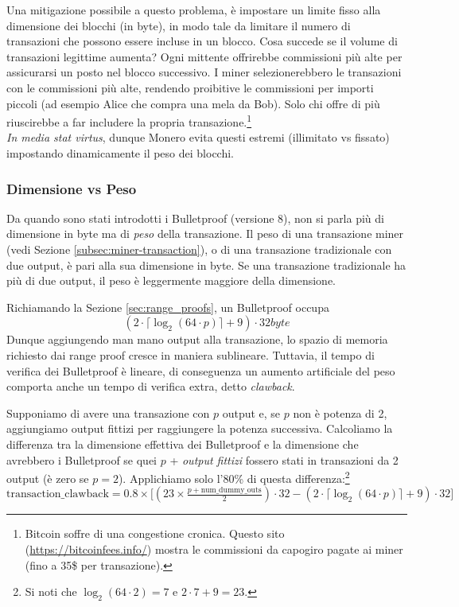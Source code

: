Una mitigazione possibile a questo problema, è impostare un limite fisso alla dimensione dei blocchi (in byte), in modo tale da limitare il numero di transazioni che possono essere incluse in un blocco. Cosa succede se il volume di transazioni legittime aumenta? Ogni mittente offrirebbe commissioni più alte per assicurarsi un posto nel blocco successivo. I miner selezionerebbero le transazioni con le commissioni più alte, rendendo proibitive le commissioni per importi piccoli (ad esempio Alice che compra una mela da Bob). Solo chi offre di più riuscirebbe a far includere la propria transazione.\footnote{Bitcoin soffre di una congestione cronica. Questo sito (\url{https://bitcoinfees.info/}) mostra le commissioni da capogiro pagate ai miner (fino a 35\$ per transazione).}\\

\emph{In media stat virtus}, dunque Monero evita questi estremi (illimitato vs fissato) impostando dinamicamente il peso dei blocchi.

\subsubsection*{Dimensione vs Peso}

Da quando sono stati introdotti i Bulletproof (versione 8), non si parla più di dimensione in byte ma di {\em peso} della transazione. Il peso di una transazione miner (vedi Sezione \ref{subsec:miner-transaction}), o di una transazione tradizionale con due output, è pari alla sua dimensione in byte. Se una transazione tradizionale ha più di due output, il peso è leggermente maggiore della dimensione.

Richiamando la Sezione \ref{sec:range_proofs}, un Bulletproof occupa\vspace{.175cm}\[(2 \cdot \lceil \log_2(64 \cdot p) \rceil + 9) \cdot 32  \mathit{byte}\] Dunque aggiungendo man mano output alla transazione, lo spazio di memoria richiesto dai range proof cresce in maniera sublineare. Tuttavia, il tempo di verifica dei Bulletproof è lineare, di conseguenza un aumento artificiale del peso comporta anche un tempo di verifica extra, detto \emph{clawback}.%

Supponiamo di avere una transazione con $p$ output e, se $p$ non è potenza di 2, aggiungiamo output fittizi per raggiungere la potenza successiva. Calcoliamo la differenza tra la dimensione effettiva dei Bulletproof e la dimensione che avrebbero i Bulletproof se quei $p$ + \emph{output fittizi} fossero stati in transazioni da 2 output (è zero se $p=2$). Applichiamo solo l’80\% di questa differenza:\footnote{Si noti che $\log_2(64 \cdot 2) = 7$ e $2\cdot7+9 = 23$.}\vspace{.175cm}
\[
\text{transaction\_clawback}
    = 0.8 \times \bigl[(23 \times \tfrac{p + \text{num\_dummy\_outs}}{2}) \cdot 32 
    - (2 \cdot \lceil \log_2(64 \cdot p) \rceil + 9) \cdot 32\bigr]
\]

